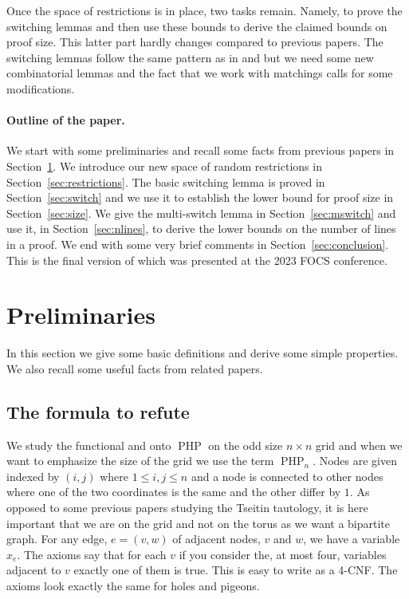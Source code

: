 \documentclass{article}\usepackage[a4paper,margin=20mm]{geometry}
\DeclareMathOperator{\PHP}{PHP}
\begin{document}
Once the space of restrictions is in place, two
tasks remain.  Namely, to prove the switching lemmas
and then use these bounds to derive the claimed
bounds on proof size.  This latter part hardly
changes compared to previous papers.  The switching lemmas follow
the same pattern as in \cite{jhtseitin} and \cite{jhkr}
but we need some new combinatorial lemmas and the
fact that we work with matchings calls
for some modifications.

\paragraph{Outline of the paper.}
We start with some preliminaries and recall some facts
from previous papers in Section~\ref{sec:prelim}.
We introduce our new space of random
restrictions in Section~\ref{sec:restrictions}.
The basic switching lemma is proved in
Section~\ref{sec:switch} and we use
it to establish the lower bound for proof size
in Section~\ref{sec:size}.  We give
the multi-switch lemma in Section~\ref{sec:mswitch} and
use it, in Section~\ref{sec:nlines}, to derive the lower bounds on the
number of lines in a proof.
We end with some very brief comments in Section~\ref{sec:conclusion}.
This is the final version of \cite{jhphpfocs} which was presented
at the 2023 FOCS conference.

\section{Preliminaries} \label{sec:prelim}

In this section we give some basic definitions and derive some
simple properties.  We also recall some
useful facts from related papers.


\subsection{The formula to refute}

We study the functional and onto $\PHP$ 
on the odd size $n\times n$ grid and when we want to emphasize
the size of the grid we use the term $\PHP_n$. Nodes are given indexed
by $(i,j)$ where $1 \leq i,j \leq n$ and a node is connected
to other nodes where one of the two coordinates is the same
and the other differ by $1$.  As opposed to some previous
papers studying the Tseitin tautology,
it is here important that we are on the grid and not on
the torus as we want a bipartite graph.  For any edge, $e=(v,w)$ of adjacent
nodes, $v$ and $w$, we have a variable $x_{e}$.  The axioms say that for each
$v$ if you consider the, at most four, variables adjacent to $v$
exactly one of them is true.  This is easy to write as
a 4-CNF.  The axioms look exactly the same
for holes and pigeons.  
\end{document}
